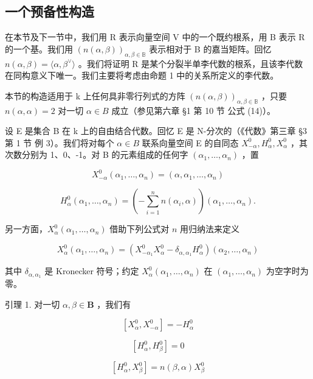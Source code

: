 \subsection{一个预备性构造}

在本节及下一节中，我们用 R 表示向量空间 V 中的一个既约根系，用 B 表示 R 的一个基。我们用 \((n(\alpha,\beta))_{\alpha,\beta\in\mathbb{B}}\) 表示相对于 B 的嘉当矩阵。回忆 \(n(\alpha,\beta)=\langle\alpha,\beta^{\vee}\rangle\) 。我们将证明 R 是某个分裂半单李代数的根系，且该李代数在同构意义下唯一。我们主要将考虑由命题 1 中的关系所定义的李代数。

本节的构造适用于 k 上任何具非零行列式的方阵 \((n(\alpha,\beta))_{\alpha,\beta\in\mathbb{B}}\) ，只要 \(n(\alpha,\alpha)=2\) 对一切 \(\alpha\in B\) 成立（参见第六章 §1 第 10 节 公式 (14)）。

设 E 是集合 B 在 k 上的自由结合代数。回忆 E 是 N-分次的（《代数》第三章 §3 第 1 节 例 3）。我们将对每个 \(\alpha\in B\) 联系向量空间 E 的自同态 \(X_{-\alpha}^{0}, H_{\alpha}^{0}, X_{\alpha}^{0}\) ，其次数分别为 1、0、-1。对 B 的元素组成的任何字 \((\alpha_{1},\ldots,\alpha_{n})\) ，置

\[
X _ {- \alpha} ^ {0} (\alpha_ {1}, \ldots , \alpha_ {n}) = (\alpha , \alpha_ {1}, \ldots , \alpha_ {n})\tag{7}
\]

\[
H _ {\alpha} ^ {0} \left(\alpha_ {1}, \dots , \alpha_ {n}\right) = \left(- \sum_ {i = 1} ^ {n} n \left(\alpha_ {i}, \alpha\right)\right) \left(\alpha_ {1}, \dots , \alpha_ {n}\right).\tag{8}
\]

另一方面，\(X_{\alpha}^{0}(\alpha_{1},\ldots ,\alpha_{n})\) 借助下列公式对 \(n\) 用归纳法来定义

\[
X _ {\alpha} ^ {0} (\alpha_ {1}, \ldots , \alpha_ {n}) = (X _ {- \alpha_ {1}} ^ {0} X _ {\alpha} ^ {0} - \delta_ {\alpha , \alpha_ {1}} H _ {\alpha} ^ {0}) (\alpha_ {2}, \ldots , \alpha_ {n})\tag{9}
\]

其中 \(\delta_{\alpha, \alpha_1}\) 是 Kronecker 符号；约定 \(X_{\alpha}^{0}(\alpha_{1}, \ldots, \alpha_{n})\) 在 \((\alpha_{1}, \ldots, \alpha_{n})\) 为空字时为零。

引理 1. 对一切 \(\alpha, \beta \in \mathbf{B}\) ，我们有

\[
[ X _ {\alpha} ^ {0}, X _ {- \alpha} ^ {0} ] = - H _ {\alpha} ^ {0}\tag{10}
\]

\[
[ H _ {\alpha} ^ {0}, H _ {\beta} ^ {0} ] = 0\tag{11}
\]

\[
[ H _ {\alpha} ^ {0}, X _ {\beta} ^ {0} ] = n (\beta , \alpha) X _ {\beta} ^ {0}\tag{12}
\]

